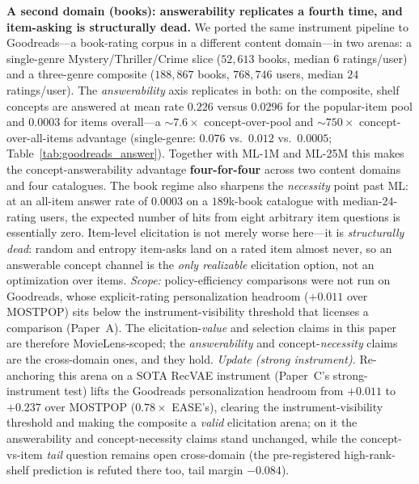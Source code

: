 \documentclass[11pt]{article}
\begin{document}
\textbf{A second domain (books): answerability replicates a fourth time, and item-asking is structurally dead.}
We ported the same instrument pipeline to Goodreads---a book-rating corpus in a different content domain---in two
arenas: a single-genre Mystery/Thriller/Crime slice ($52{,}613$ books, median $6$ ratings/user) and a three-genre
composite ($188{,}867$ books, $768{,}746$ users, median $24$ ratings/user). The \emph{answerability} axis replicates in
both: on the composite, shelf concepts are answered at mean rate $0.226$ versus $0.0296$ for the popular-item pool and
$0.0003$ for items overall---a $\sim\!7.6{\times}$ concept-over-pool and $\sim\!750{\times}$ concept-over-all-items
advantage (single-genre: $0.076$ vs.\ $0.012$ vs.\ $0.0005$; Table~\ref{tab:goodreads_answer}). Together with ML-1M and
ML-25M this makes the concept-answerability advantage \textbf{four-for-four} across two content domains and four
catalogues. The book regime also sharpens the \emph{necessity} point past ML: at an all-item answer rate of $0.0003$ on
a $189$k-book catalogue with median-$24$-rating users, the expected number of hits from eight arbitrary item questions
is essentially zero. Item-level elicitation is not merely worse here---it is \emph{structurally dead}: random and
entropy item-asks land on a rated item almost never, so an answerable concept channel is the \emph{only realizable}
elicitation option, not an optimization over items. \emph{Scope:} policy-efficiency comparisons were not run on Goodreads, whose explicit-rating personalization headroom
($+0.011$ over MOSTPOP) sits below the instrument-visibility threshold that licenses a comparison (Paper~A). The
elicitation-\emph{value} and selection claims in this paper are therefore MovieLens-scoped; the \emph{answerability}
and concept-\emph{necessity} claims are the cross-domain ones, and they hold. \emph{Update (strong instrument).}
Re-anchoring this arena on a SOTA RecVAE instrument (Paper~C's strong-instrument test) lifts the Goodreads personalization
headroom from $+0.011$ to $+0.237$ over MOSTPOP ($0.78\times$ EASE's), clearing the instrument-visibility threshold and
making the composite a \emph{valid} elicitation arena; on it the answerability and concept-necessity claims stand
unchanged, while the concept-vs-item \emph{tail} question remains open cross-domain (the pre-registered high-rank-shelf
prediction is refuted there too, tail margin $-0.084$).
\end{document}
